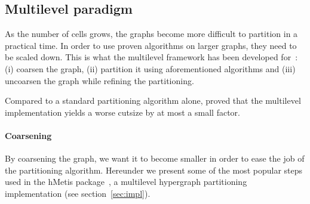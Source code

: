 \documentclass[11pt,a4paper]{report} %
\theoremstyle{customdef}
\begin{document}
\subsection{Multilevel paradigm}\label{sec:mul-para}
As the number of cells grows, the graphs become more difficult to partition in a practical time.
In order to use proven algorithms on larger graphs, they need to be scaled down.
This is what the multilevel framework has been developed for~\citep{Karypis1995b}: (i) coarsen the graph, (ii) partition it using aforementioned algorithms and (iii) uncoarsen the graph while refining the partitioning.

Compared to a standard partitioning algorithm alone, \citet{Karypis1995a} proved that the multilevel implementation yields a worse cutsize by at most a small factor.





\paragraph{Coarsening}
By coarsening the graph, we want it to become smaller in order to ease the job of the partitioning algorithm.    
Hereunder we present some of the most popular steps used in the hMetis package~\citep{Karypis1999}, a multilevel hypergraph partitioning implementation (see section~\ref{sec:impl}).  
\end{document}
